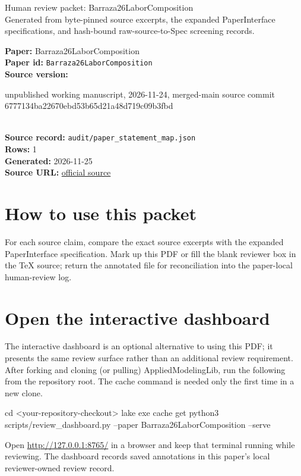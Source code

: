 \documentclass[10pt]{article}
\begin{document}
\fontsize{9}{10}\selectfont

\begin{center}
{\LARGE Human review packet: Barraza26LaborComposition}\\[0.35em]
\small Generated from byte-pinned source excerpts, the expanded PaperInterface
specifications, and hash-bound raw-source-to-Spec screening records.
\end{center}

\noindent\textbf{Paper:} Barraza26LaborComposition\\
\textbf{Paper id:} \texttt{Barraza26LaborComposition}\\
\textbf{Source version:} \parbox[t]{0.76\linewidth}{\raggedright unpublished working manuscript, 2026-11-24, merged-main source commit 6777134ba22670ebd53b65d21a48d719c09b3fbd}\\
\textbf{Source record:} \texttt{audit/paper\_statement\_map.json}\\
\textbf{Rows:} 1\\
\textbf{Generated:} 2026-11-25\\
\textbf{Source URL:} \href{https://github.com/johnbarraza/ai-project/blob/6777134ba22670ebd53b65d21a48d719c09b3fbd/paper/paper.pdf}{official source}





\section*{How to use this packet}
For each source claim, compare the exact source excerpts with the expanded
PaperInterface specification. Mark up this PDF or fill the blank reviewer box in the TeX source;
return the annotated file for reconciliation into the paper-local human-review
log.

\section*{Open the interactive dashboard}
The interactive dashboard is an optional alternative to using this PDF; it
presents the same review surface rather than an additional review requirement.
After forking and cloning (or pulling) AppliedModelingLib, run the following from the
repository root. The cache command is needed only the first time in a new clone.
\begin{ReviewVerbatim}
cd <your-repository-checkout>
lake exe cache get
python3 scripts/review_dashboard.py --paper Barraza26LaborComposition --serve
\end{ReviewVerbatim}
Open \url{http://127.0.0.1:8765/} in a browser and keep that terminal running
while reviewing. The dashboard records saved annotations in this paper's local
reviewer-owned review record.
\end{document}
